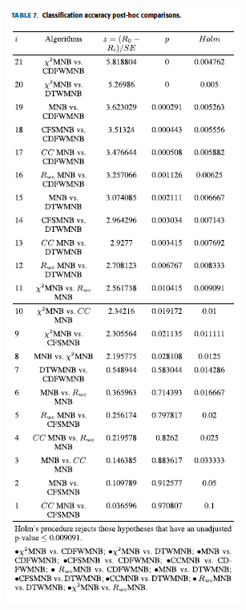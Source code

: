 \documentclass[12pt, a4paper]{article}
\begin{document}
\begin{figure}
\begin{subfigure}{0.45\linewidth}
        \includegraphics[scale=0.55]{images/article3/table7.png}
        \caption{}
        \label{a3_table7}
    \end{subfigure}
    \hfill
    \begin{subfigure}{0.45\linewidth}
        \centering

\end{subfigure}
\end{figure}
\end{document}
